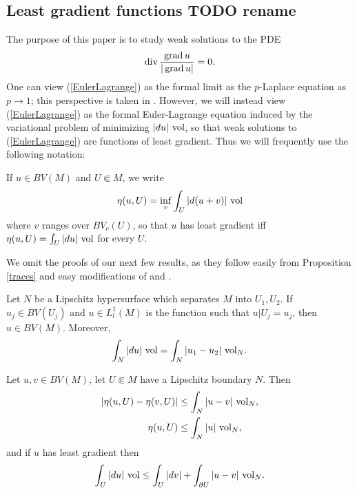 \subsection{Least gradient functions TODO rename}
The purpose of this paper is to study weak solutions to the PDE
\begin{equation}\label{EulerLagrange}
\operatorname{div} \frac{\operatorname{grad} u}{|\operatorname{grad} u|} = 0.
\end{equation}
One can view (\ref{EulerLagrange}) as the formal limit as the $p$-Laplace equation as $p \to 1$; this perspective is taken in \cite[\S4]{daskalopoulos2020transverse}.
However, we will instead view (\ref{EulerLagrange}) as the formal Euler-Lagrange equation induced by the variational problem of minimizing $|du|~\mathrm{vol}$, so that weak solutions to (\ref{EulerLagrange}) are functions of least gradient.
Thus we will frequently use the following notation:

\begin{notation}
If $u \in BV(M)$ and $U \Subset M$, we write
$$\eta(u, U) = \inf_v \int_U |d(u+v)| ~\mathrm{vol}$$
where $v$ ranges over $BV_c(U)$, so that $u$ has least gradient iff $\eta(u, U) = \int_U |du| ~\mathrm{vol}$ for every $U$.
\end{notation}

We omit the proofs of our next few results, as they follow easily from Proposition \ref{traces} and easy modifications of \cite[Teorema 2]{Miranda67} and \cite[Lemma 5.6, Remark 5.7]{Giusti77}.

\begin{proposition}[gluing]\label{gluing}
Let $N$ be a Lipschitz hypersurface which separates $M$ into $U_1,U_2$.
If $u_j \in BV(U_j)$ and $u \in L^1_l(M)$ is the function such that $u|U_j = u_j$, then $u \in BV(M)$.
Moreover,
\begin{equation}
\label{glued BV norm}
\int_N |du| ~\mathrm{vol} = \int_N |u_1 - u_2| ~\mathrm{vol}_N.
\end{equation}
\end{proposition}

\begin{proposition}\label{estimates on good set}
Let $u, v \in BV(M)$, let $U \Subset M$ have a Lipschitz boundary $N$. Then
\begin{align}
|\eta(u, U) - \eta(v, U)| &\leq \int_N |u - v| ~\mathrm{vol}_N, \label{a priori estimate 1}\\
\eta(u, U) &\leq \int_N |u| ~\mathrm{vol}_N, \label{a priori estimate 2}
\end{align}
and if $u$ has least gradient then
\begin{equation}
\int_U |du| ~\mathrm{vol} \leq \int_U |dv| + \int_{\partial U} |u - v| ~\mathrm{vol}_N. \label{a priori estimate 3}
\end{equation}
\end{proposition}


